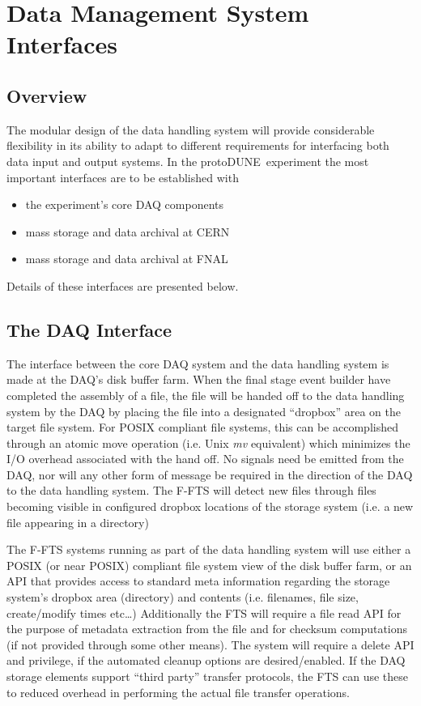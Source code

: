 \documentclass[pdftex,12pt,letter]{article}
\newcommand{\pd}{protoDUNE\ }
\begin{document}
\section{Data Management System Interfaces}
\subsection{Overview}
The modular design of the data handling system will provide considerable flexibility in its ability to adapt to different requirements
for interfacing  both data input and output systems.  In the \pd experiment the most important interfaces are to be established with
\begin{itemize}
\item the experiment’s core DAQ components
\item mass storage and data archival at CERN
\item mass storage and data archival at FNAL
\end{itemize}

\noindent
 Details of these interfaces are presented below.

\subsection{The DAQ Interface}
The interface between the core DAQ system and the data handling system is made at the DAQ’s disk buffer farm.
When the final stage event builder have completed the assembly of a file, the file will be handed off to the data handling system
by the DAQ by placing the file into a designated ``dropbox'' area on the target file system.  For POSIX compliant file systems,
this can be accomplished through an atomic move operation (i.e. Unix \textit{mv} equivalent) which minimizes the I/O overhead associated
with the hand off.  No signals need be emitted from the DAQ, nor will any other form of message be required in the direction of the
DAQ to the data handling system.  The F-FTS will detect new files through files becoming visible in configured dropbox locations of
the storage system (i.e. a new file appearing in a directory) 

The F-FTS systems running as part of the data handling system will use either a POSIX (or near POSIX) compliant file system view of the disk buffer farm,
or an API that provides access to standard meta information regarding the storage system’s dropbox area (directory) and contents
(i.e. filenames, file size, create/modify times etc…)  Additionally the FTS will require a file read API for the purpose of metadata
extraction from the file and for checksum computations (if not provided through some other means).  The system will require a
delete API and privilege, if the automated cleanup options are desired/enabled.  If the DAQ storage elements support ``third party''
transfer protocols, the FTS can use these to reduced overhead in performing the actual file transfer operations.
\end{document}
